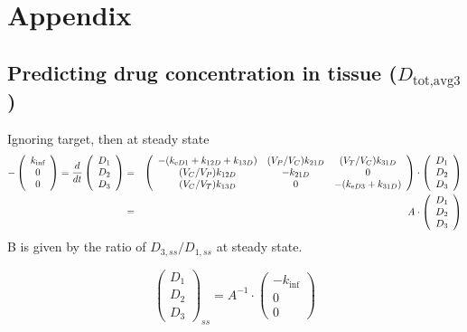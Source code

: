 \section{Appendix}

\subsection{Predicting drug concentration in tissue ($D_{\text{tot,avg}3}$)}
Ignoring target, then at steady state
\begin{eqnarray*}
-\left(\begin{array}{c}
k_{\text{inf}}\\
0\\
0
\end{array}\right)=\frac{d}{dt}\left(\begin{array}{c}
D_{1}\\
D_{2}\\
D_{3}
\end{array}\right) & = & \left(\begin{array}{ccc}
-(k_{\text{e} D1}+k_{12D}+k_{13D}) & (V_{P}/V_{C})k_{21D} & (V_{T}/V_{C})k_{31D}\\
(V_{C}/V_{P})k_{12D} & -k_{21D} & 0\\
(V_{C}/V_{T})k_{13D} & 0 & -(k_{\text{e} D3}+k_{31D})
\end{array}\right)\cdot\left(\begin{array}{c}
D_{1}\\
D_{2}\\
D_{3}
\end{array}\right)\\
 & = & A\cdot\left(\begin{array}{c}
D_{1}\\
D_{2}\\
D_{3}
\end{array}\right)
\end{eqnarray*}
B is given by the ratio of $D_{3,ss}/D_{1,ss}$ at steady state. 

\[
\left(\begin{array}{c}
D_{1}\\
D_{2}\\
D_{3}
\end{array}\right)_{ss}=A^{-1}\cdot\left(\begin{array}{c}
-k_{\text{inf}}\\
0\\
0
\end{array}\right)
\]


